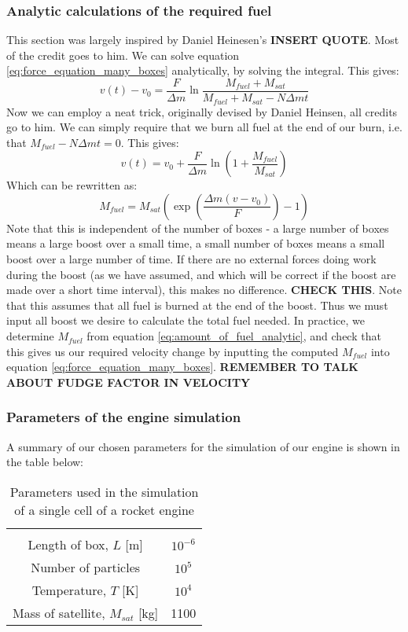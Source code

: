 \documentclass[a4paper,10pt,english]{article}
\begin{document}
\subsubsection{Analytic calculations of the required fuel}\label{Analytic_fuel}
This section was largely inspired by Daniel Heinesen's \textbf{INSERT QUOTE}. Most of the credit goes to him. We can solve equation \ref{eq:force_equation_many_boxes} analytically, by solving the integral. This gives:
$$v(t)-v_0=\frac{F}{\Delta m}\ln \frac{M_{fuel}+M_{sat}}{M_{fuel}+M_{sat}-N\Delta m t}$$
Now we can employ a neat trick, originally devised by Daniel Heinsen, all credits go to him. We can simply require that we burn all fuel at the end of our burn, i.e. that $M_{fuel}-N\Delta m t=0$. This gives:
$$v(t)=v_0+\frac{F}{\Delta m}\ln \left(1+\frac{M_{fuel}}{M_{sat}}\right)$$
Which can be rewritten as:
\begin{equation}\label{eq:amount_of_fuel_analytic}
M_{fuel}=M_{sat}\left(\exp\left(\frac{\Delta m(v-v_0)}{F}\right)-1\right)
\end{equation}
Note that this is independent of the number of boxes - a large number of boxes means a large boost over a small time, a small number of boxes means a small boost over a large number of time. If there are no external forces doing work during the boost (as we have assumed, and which will be correct if the boost are made over a short time interval), this makes no difference. \textbf{CHECK THIS}. Note that this assumes that all fuel is burned at the end of the boost. Thus we must input all boost we desire to calculate the total fuel needed. In practice, we determine  $M_{fuel}$ from equation \ref{eq:amount_of_fuel_analytic}, and check that this gives us our required velocity change by inputting the computed $M_{fuel}$ into equation \ref{eq:force_equation_many_boxes}. \textbf{REMEMBER TO TALK ABOUT FUDGE FACTOR IN VELOCITY}
\newpage
\subsubsection{Parameters of the engine simulation}
A summary of our chosen parameters for the simulation of our engine is shown in the table below:\\
\begin{table}[!htbp]
\caption{Parameters used in the simulation of a single cell of a rocket engine}\label{tab:particle_in_a_box}
\begin{center}
\begin{tabular}{|c|c|}
\hline
\\[-1em]
Length of box, $L$ [m] & $10^{-6}$\\
Number of particles & $10^5$\\
Temperature, $T$ [K] & $10^4$\\
Mass of satellite, $M_{sat}$ [kg] & 1100\\
\hline
\end{tabular}
\end{center}
\end{table}
\end{document}
